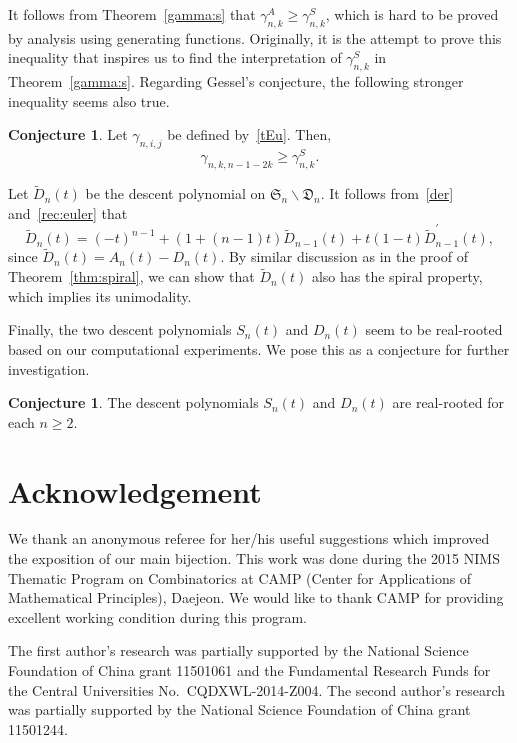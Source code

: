 \documentclass[12pt]{amsart}
\numberwithin{equation}{section}
\theoremstyle{plain}
\theoremstyle{definition}
\newtheorem{conjecture}[theorem]{Conjecture}
\def\S{\mathfrak{S}}
\def\D{\mathfrak{D}}
\begin{document}


 
It follows from Theorem~\ref{gamma:s} that 
$\gamma^A_{n,k}\geq  \gamma^S_{n,k}$,
which is hard to be proved by analysis using generating functions.
Originally, it is the attempt to prove this inequality that inspires us to find the interpretation of $\gamma^S_{n,k}$ in Theorem~\ref{gamma:s}. 
 Regarding Gessel's conjecture,  the following stronger inequality seems also true.

\begin{conjecture}
Let $\gamma_{n,i,j}$ be defined by~\eqref{tEu}. Then,
$$
\gamma_{n,k,n-1-2k}\geq \gamma^S_{n,k}.
$$
\end{conjecture}



Let $\widetilde{D}_n(t)$ be the descent polynomial on $\S_n\backslash\D_n$. It follows from~\eqref{der} and~\eqref{rec:euler} that 
 \begin{equation*}
\widetilde{D}_n(t)=(-t)^{n-1}+(1+(n-1)t)\widetilde{D}_{n-1}(t)+t(1-t)\widetilde{D}^{\prime}_{n-1}(t),
 \end{equation*}
since $\widetilde{D}_n(t)=A_n(t)-D_n(t)$. By similar discussion as in the proof of Theorem~\ref{thm:spiral}, we can show that $\widetilde{D}_n(t)$ also has the spiral property, which implies its unimodality.



Finally, the two descent polynomials $S_n(t)$ and $D_n(t)$ seem to be 
real-rooted based on our computational experiments. We pose this as a conjecture for further investigation.
\begin{conjecture} 
The descent polynomials $S_n(t)$ and $D_n(t)$ are real-rooted for each $n\geq2$.
\end{conjecture}
 
\section*{Acknowledgement} 
We thank an anonymous referee for her/his useful suggestions which improved the exposition of our main bijection.  This work was done during the 
2015 NIMS Thematic Program on Combinatorics 
at CAMP (Center for Applications of Mathematical Principles), Daejeon.
We  would like to thank CAMP for providing excellent working condition
during this program. 

The first author's research was partially supported by the National Science Foundation of China grant 11501061 and the Fundamental Research Funds for the Central Universities No.~CQDXWL-2014-Z004. The second author's research was partially supported by the National Science Foundation of China grant 11501244. 
\end{document}
